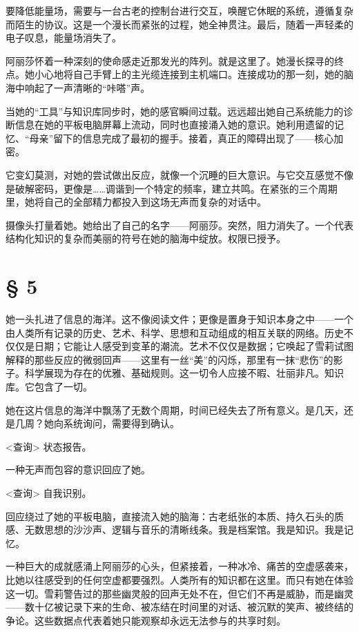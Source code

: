 要降低能量场，需要与一台古老的控制台进行交互，唤醒它休眠的系统，遵循复杂而陌生的协议。这是一个漫长而紧张的过程，她全神贯注。最后，随着一声轻柔的电子叹息，能量场消失了。

阿丽莎怀着一种深刻的使命感走近那发光的阵列。就是这里了。她漫长探寻的终点。她小心地将自己手臂上的主光缆连接到主机端口。连接成功的那一刻，她的脑海中响起了一声清晰的“咔嗒”声。

当她的“工具”与知识库同步时，她的感官瞬间过载。远远超出她自己系统能力的诊断信息在她的平板电脑屏幕上流动，同时也直接涌入她的意识。她利用遗留的记忆、“母亲”留下的信息完成了最初的握手。接着，真正的障碍出现了——核心加密。

它变幻莫测，对她的尝试做出反应，就像一个沉睡的巨大意识。与它交互感觉不像是破解密码，更像是……调谐到一个特定的频率，建立共鸣。在紧张的三个周期里，她将自己的全部精力都投入到这场无声而复杂的对话中。

摄像头打量着她。她给出了自己的名字——阿丽莎。突然，阻力消失了。一个代表结构化知识的复杂而美丽的符号在她的脑海中绽放。{\sffamily 权限已授予。}

\section{§ 5}

她一头扎进了信息的海洋。这不像阅读文件；更像是置身于知识本身之中——一个由人类所有记录的历史、艺术、科学、思想和互动组成的相互关联的网络。历史不仅仅是日期；它能让人感受到变革的潮流。艺术不仅仅是数据；它唤起了雪莉试图解释的那些反应的微弱回声——这里有一丝“美”的闪烁，那里有一抹“悲伤”的影子。科学展现为存在的优雅、基础规则。这一切令人应接不暇、壮丽非凡。知识库。它包含了一切。

她在这片信息的海洋中飘荡了无数个周期，时间已经失去了所有意义。是几天，还是几周？她向系统询问，需要得到确认。

{\sffamily <查询> 状态报告。}

一种无声而包容的意识回应了她。

{\sffamily <查询> 自我识别。}

回应绕过了她的平板电脑，直接流入她的脑海：古老纸张的本质、持久石头的质感、无数思想的沙沙声、逻辑与音乐的清晰线条。{\sffamily 我是档案馆。我是知识。我是记忆。}

一种巨大的成就感涌上阿丽莎的心头，但紧接着，一种冰冷、痛苦的空虚感袭来，比她以往感受到的任何空虚都要强烈。人类所有的知识都在这里。而只有她在体验这一切。雪莉警告过的那些幽灵般的回声无处不在，但它们不再是威胁，而是幽灵——数十亿被记录下来的生命、被冻结在时间里的对话、被沉默的笑声、被终结的争论。这些数据点代表着她只能观察却永远无法参与的共享时刻。

